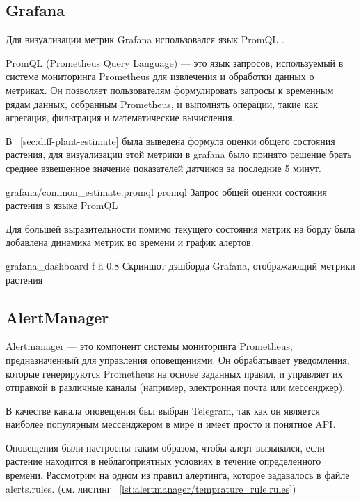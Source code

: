 \documentclass{bmstu}
\begin{document}
    \subsection{Grafana}

    Для визуализации метрик Grafana использовался язык PromQL \cite{styopaChtoTakoePromQL2023}.

    PromQL (Prometheus Query Language) — это язык запросов, используемый в системе мониторинга Prometheus для извлечения
    и обработки данных о метриках.
    Он позволяет пользователям формулировать запросы к временным рядам данных, собранным Prometheus,
    и выполнять операции, такие как агрегация, фильтрация и математические вычисления.

    В ~\ref{sec:diff-plant-estimate} была выведена формула оценки общего состояния растения,
    для визуализации этой метрики в grafana было принято решение брать среднее взвешенное значение показателей
    датчиков за последние 5 минут.

        {grafana/common_estimate.promql} %
        {promql}
        {Запрос общей оценки состояния растения в языке PromQL} %

    Для большей выразительности помимо текущего состояния метрик на борду была добавлена динамика метрик во времени и
    график алертов.

        {grafana_dashboard}
        {f}
        {h}
        {0.8\textwidth}
        {Скриншот дэшборда Grafana, отображающий метрики растения}

    \subsection{AlertManager}
    Alertmanager — это компонент системы мониторинга Prometheus, предназначенный для управления оповещениями.
    Он обрабатывает уведомления, которые генерируются Prometheus на основе заданных правил, и управляет их отправкой
    в различные каналы (например, электронная почта или мессенджер).

    В качестве канала оповещения был выбран Telegram, так как он является наиболее популярным мессенджером в мире
    и имеет просто и понятное API.

    Оповещения были настроены таким образом, чтобы алерт вызывался, если растение находится
    в неблагоприятных условиях в течение определенного времени.
    Рассмотрим на одном из правил алертинга, которое задавалось в файле alerts.rules.
    (см. листинг ~\ref{lst:alertmanager/temprature_rule.rules})
\end{document}
